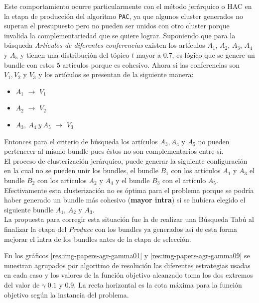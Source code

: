 Este comportamiento ocurre particularmente con el método jerárquico o HAC en la etapa de producción del algoritmo \texttt{PAC}, ya que algunos cluster generados no superan el presupuesto pero no pueden ser unidos con otro cluster porque invalida la complementariedad que se quiere lograr. Suponiendo que para la búsqueda \textit{Artículos de diferentes conferencias} existen los artículos $A_1$, $A_2$, $A_3$, $A_4$ y $A_5$ y tienen una distribución del tópico $t$ mayor a $0.7$, es lógico que se genere un bundle con estos 5 artículos porque es cohesivo. Ahora si las conferencias son $V_1, V_2$ y $V_3$ y los artículos se presentan de la siguiente manera:
\begin{itemize}
	\item $A_1$ $\rightarrow$ $V_1$
	\item $A_2$ $\rightarrow$ $V_2$
	\item $A_3,\ A_4\ y\ A_5$ $\rightarrow$ $V_3$
\end{itemize} 

Entonces para el criterio de búsqueda los artículos $A_3, A_4$ y $A_5$ no pueden pertenecer al mismo bundle pues éstos no son complementarios entre sí.\\

El proceso de clusterización jerárquico, puede generar la siguiente configuración en la cual no se pueden unir los bundles, el bundle $B_1$ con los artículos $A_1$ y $A_3$ el bundle $B_2$ con los artículos $A_2$ y $A_4$ y el bundle $B_3$ con el artículo $A_5$. Efectivamente esta clusterización no es óptima para el problema porque se podría haber generado un bundle más cohesivo (\textbf{mayor intra}) si se hubiera elegido el siguiente bundle $A_1$, $A_2$ y $A_3$.\\

La propuesta para corregir esta situación fue la de realizar una Búsqueda Tabú al finalizar la etapa del \textit{Produce} con los bundles ya generados así de esta forma mejorar el intra de los bundles antes de la etapa de selección.

\newpage

En los gráficos \ref{res:img-papers-agr-gamma01} y \ref{res:img-papers-agr-gamma09} se muestran agrupados por algoritmo de resolución las diferentes estrategias usadas en cada caso y los valores de la función objetivo alcanzado toma los dos extremos del valor de $\gamma$ $0.1$ y $0.9$. La recta horizontal es la cota máxima para la función objetivo según la instancia del problema.

